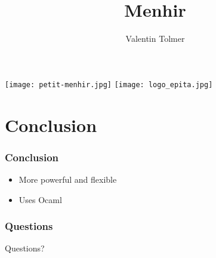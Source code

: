 \documentclass{beamer}
\title{Menhir}
\author{Valentin Tolmer}
\date{}
\institute{GCONFS -- EPITA 2014}
\newlength{\wideitemsep}
\let\olditem\item
\renewcommand{\item}{\setlength{\itemsep}{\wideitemsep}\olditem}
\begin{document}
\begin{frame}
  \titlepage
    \texttt{[image: petit-menhir.jpg]}
    \hfill
    \texttt{[image: logo\_epita.jpg]}
\end{frame}

\begin{frame}
  \tableofcontents[pausesections ]
\end{frame}







\section{Conclusion}
\setcounter{subsection}{1}
\begin{frame}
\frametitle{Conclusion}
  \begin{itemize}[<+->]
    \item More powerful and flexible
    \item Uses Ocaml
  \end{itemize}
\end{frame}

\begin{frame}
\frametitle{Questions}
  Questions?
\end{frame}
\end{document}
